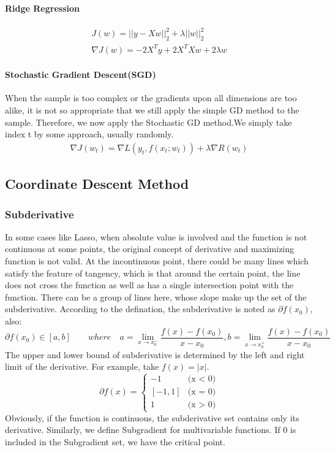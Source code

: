 \documentclass{article}
\begin{document}
	\paragraph{Ridge Regression}
	\begin{gather*}
		J(w) = ||y - Xw||^2_2 + \lambda ||w||^2_2\\
		\nabla J(w) = -2X^Ty + 2X^TXw + 2\lambda w
	\end{gather*}
	\paragraph{Stochastic Gradient Descent(SGD)}
	When the sample is too complex or the gradients upon all dimensions are too alike, it is not so appropriate that we still apply the simple GD method to the sample. Therefore, we now apply the Stochastic GD method.We simply take index t by some approach, usually randomly.
	\begin{gather*}
		\nabla J(w_t) = \nabla L(y_t, f(x_t;w_t)) + \lambda \nabla R(w_t)
	\end{gather*}
\subsection{Coordinate Descent Method}
	\subsubsection{Subderivative}
	In some cases like Lasso, when absolute value is involved and the function is not continuous at some points, the original concept of derivative and maximizing function is not valid. At the incontinuous point, there could be many lines which satisfy the feature of tangency, which is that around the certain point, the line does not cross the function as well as has a single intersection point with the function. There can be a group of lines here, whose slope make up the set of the subderivative. According to the defination, the subderivative is noted as $\partial f(x_0)$, also:
	\begin{displaymath}
		\partial f(x_0) \in
		[a,b]\qquad where\quad 
		a = \lim_{x \rightarrow x_0^-} \frac{f(x)-f(x_0)}{x-x_0},
		b = \lim_{x \rightarrow x_0^+} \frac{f(x)-f(x_0)}{x-x_0}
	\end{displaymath}
	The upper and lower bound of subderivative is determined by the left and right limit of the derivative. For example, take $f(x) = |x|$.
	\begin{displaymath}
		\partial f(x) = \left\{\begin{array}{ll}
			-1 & \textrm{(x < 0)}\\
			\left[-1,1\right] & \textrm{(x = 0)}\\
			1 & \textrm{(x > 0)}
			\end{array} \right.
	\end{displaymath}
	Obviously, if the function is continuous, the subderivative set contains only its derivative. Similarly, we define Subgradient for multivariable functions. If 0 is included in the Subgradient set, we have the critical point.
	
\end{document}
